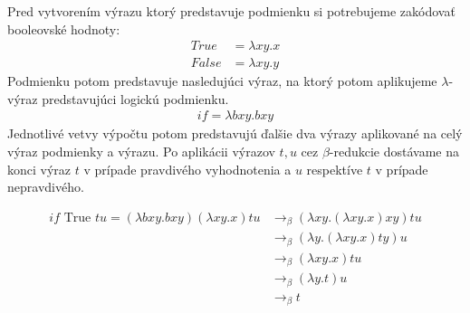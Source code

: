 \documentclass[a4paper,10pt,oneside]{report}%
\begin{document}
    Pred vytvorením výrazu ktorý predstavuje podmienku si potrebujeme zakódovať
booleovské hodnoty:
    \begin{align*}
        True &= \lambda x y . x \\
        False &= \lambda x y . y
    \end{align*}
    Podmienku potom predstavuje nasledujúci výraz, na ktorý potom aplikujeme $\lambda$-výraz
predstavujúci logickú podmienku.
\begin{align*}
    if = \lambda b x y . b x y
\end{align*}
    Jednotlivé vetvy výpočtu potom predstavujú ďalšie dva výrazy aplikované na celý
výraz podmienky a výrazu.
    Po aplikácii výrazov $t,u$ cez $\beta$-redukcie dostávame na konci výraz $t$
v prípade pravdivého vyhodnotenia a $u$ respektíve $t$ v prípade nepravdivého.

\begin{align*}
    if \textrm{ True } t u = (\lambda bxy.bxy)(\lambda xy.x) t u & \to_{\beta} (\lambda xy.(\lambda xy.x)xy)tu \\
                                                     & \to_{\beta} (\lambda y.( \lambda xy.x)ty)u \\
                                                     & \to_{\beta} (\lambda xy.x)tu \\
                                                     & \to_{\beta} (\lambda y.t)u \\
                                                     & \to_{\beta} t
\end{align*}
\end{document}
